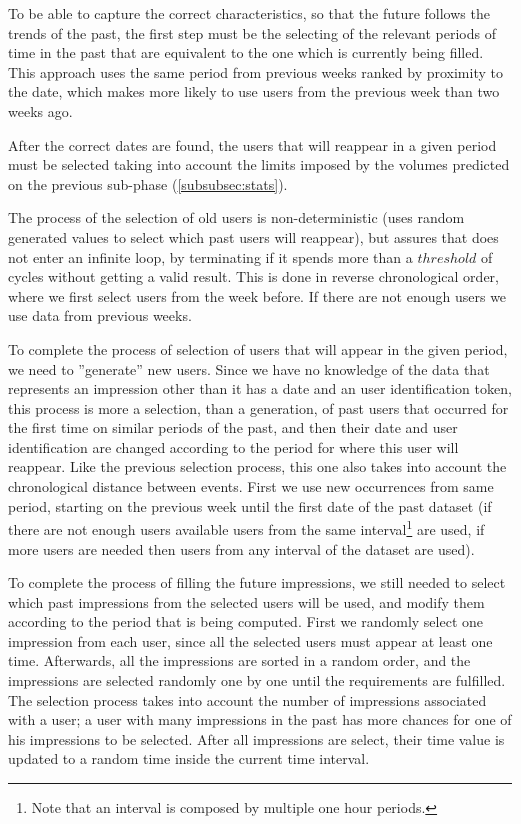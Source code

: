 To be able to capture the correct characteristics, so that the future follows the
trends of the past, the first step must be the selecting of the relevant periods of
time in the past that are equivalent to the one which is currently being filled.
This approach uses the same period from previous weeks ranked by proximity to
the date, which makes more likely to use users from the previous week than two
weeks ago.

After the correct dates are found, the users that will reappear in a given
period must be selected taking into account the limits imposed by the volumes
predicted on the previous sub-phase (\ref{subsubsec:stats}).

The process of the selection of old users is non-deterministic (uses random generated
values to select which past users will reappear), but assures that does not enter
an infinite loop, by terminating if it spends more than a $threshold$ of cycles
without getting a valid result. This is done in reverse chronological order,
where we first select users from the week before. If there are not enough
users we use data from previous weeks.

To complete the process of selection of users that will appear in the given
period, we need to ''generate'' new users. Since we have no knowledge of the
data that represents an impression other than it has a date and an user
identification token, this process is more a selection, than a generation, of
past users that occurred for the first time on similar periods of the past, and
then their date and user identification are changed according to the period for
where this user will reappear. Like the previous selection process, this one also
takes into account the chronological distance between events. First we use new
occurrences from same period, starting on the previous week until the first date
of the past dataset (if there are not enough users available users from the
same interval\footnote{Note that an interval is composed by multiple one hour
periods.} are used, if more users are needed then users from any interval of the
dataset are used).

To complete the process of filling the future impressions, we still needed to
select which past impressions from the selected users will be used, and modify
them according to the period that is being computed. First we randomly
select one impression from each user, since all the selected users must appear at
least one time. Afterwards, all the impressions are sorted in a random order, and
the impressions are selected randomly one by one until the requirements are
fulfilled.
The selection process takes into account the number of impressions associated
with a user; a user with many impressions in the past has more chances for one
of his impressions to be selected.
After all impressions are select, their time value is updated to a random time
inside the current time interval.

